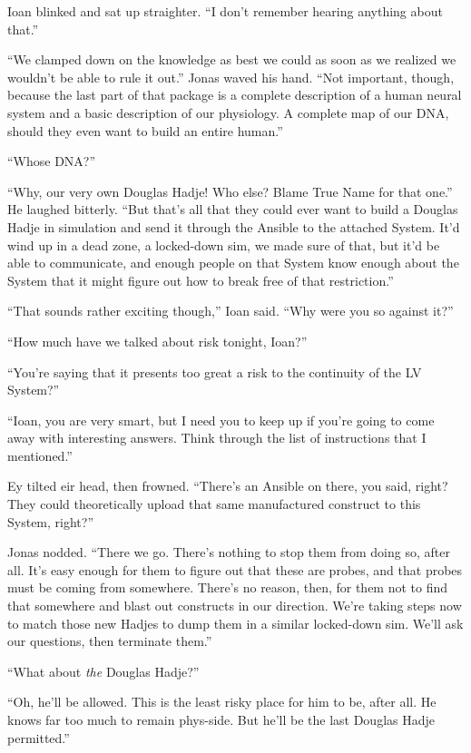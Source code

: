 Ioan blinked and sat up straighter. ``I don't remember hearing anything about that.''

``We clamped down on the knowledge as best we could as soon as we realized we wouldn't be able to rule it out.'' Jonas waved his hand. ``Not important, though, because the last part of that package is a complete description of a human neural system and a basic description of our physiology. A complete map of our DNA, should they even want to build an entire human.''

``Whose DNA?''

``Why, our very own Douglas Hadje! Who else? Blame True Name for that one.'' He laughed bitterly. ``But that's all that they could ever want to build a Douglas Hadje in simulation and send it through the Ansible to the attached System. It'd wind up in a dead zone, a locked-down sim, we made sure of that, but it'd be able to communicate, and enough people on that System know enough about the System that it might figure out how to break free of that restriction.''

``That sounds rather exciting though,'' Ioan said. ``Why were you so against it?''

``How much have we talked about risk tonight, Ioan?''

``You're saying that it presents too great a risk to the continuity of the LV System?''

``Ioan, you are very smart, but I need you to keep up if you're going to come away with interesting answers. Think through the list of instructions that I mentioned.''

Ey tilted eir head, then frowned. ``There's an Ansible on there, you said, right? They could theoretically upload that same manufactured construct to this System, right?''

Jonas nodded. ``There we go. There's nothing to stop them from doing so, after all. It's easy enough for them to figure out that these are probes, and that probes must be coming from somewhere. There's no reason, then, for them not to find that somewhere and blast out constructs in our direction. We're taking steps now to match those new Hadjes to dump them in a similar locked-down sim. We'll ask our questions, then terminate them.''

``What about \emph{the} Douglas Hadje?''

``Oh, he'll be allowed. This is the least risky place for him to be, after all. He knows far too much to remain phys-side. But he'll be the last Douglas Hadje permitted.''


